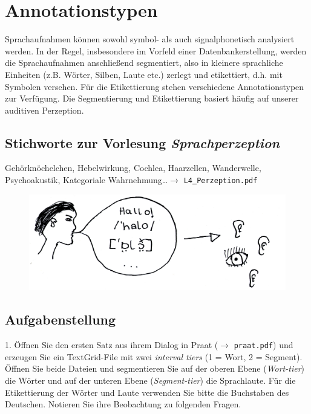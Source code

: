 \documentclass[11pt]{book}
\begin{document}
\chapter{Annotationstypen}

Sprachaufnahmen können sowohl symbol- als auch signalphonetisch analysiert werden. In der Regel, insbesondere im Vorfeld einer Datenbankerstellung, werden die Sprachaufnahmen anschließend segmentiert, also in kleinere sprachliche Einheiten (z.\thinspace B. Wörter, Silben, Laute etc.) zerlegt und etikettiert, d.\thinspace h. mit Symbolen versehen. Für die Etikettierung stehen verschiedene Annotationstypen zur Verfügung. Die Segmentierung und Etikettierung basiert häufig auf unserer auditiven Perzeption.

\section{Stichworte zur Vorlesung \em{Sprachperzeption}}

Gehörknöchelchen, Hebelwirkung, Cochlea, Haarzellen, Wanderwelle, Psychoakustik, Kategoriale Wahrnehmung\dots $\rightarrow$ {\tt L4\underline{\ }Perzeption.pdf}

\begin{figure}[htbp]
\begin{center}
\includegraphics[width=\textwidth]{grafiken/annotationstypen/annotationstypen}
\label{t3}
\end{center}
\end{figure}
\section{Aufgabenstellung}
 
1.	Öffnen Sie den ersten Satz aus ihrem Dialog in Praat ($\rightarrow$ {\tt praat.pdf}) und erzeugen Sie ein TextGrid-File mit zwei \emph{interval tiers} (1 = Wort, 2 = Segment). Öffnen Sie beide Dateien und segmentieren Sie auf der oberen Ebene (\emph{Wort-tier}) die Wörter und auf der unteren Ebene (\emph{Segment-tier}) die Sprachlaute. Für die Etikettierung der Wörter und Laute verwenden Sie bitte die Buchstaben des Deutschen. Notieren Sie ihre Beobachtung zu folgenden Fragen.\\
\newline
\end{document}
